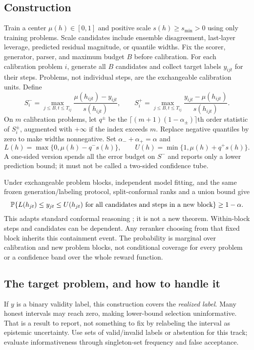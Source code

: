\subsection{Construction}
Train a center $\mu(h)\in[0,1]$ and positive scale $s(h)\ge s_{\min}>0$ using
only training problems. Scale candidates include ensemble disagreement,
last-layer leverage, predicted residual magnitude, or quantile widths. Fix the
scorer, generator, parser, and maximum budget $B$ before calibration.
For each calibration problem $i$, generate all $B$ candidates and collect target
labels $y_{ijt}$ for their steps. Problems, not individual steps, are the
exchangeable calibration units. Define
\[
 S_i^-=\max_{j\le B,t\le T_{ij}}\frac{\mu(h_{ijt})-y_{ijt}}{s(h_{ijt})},
 \qquad
 S_i^+=\max_{j\le B,t\le T_{ij}}\frac{y_{ijt}-\mu(h_{ijt})}{s(h_{ijt})}.
\]
On $m$ calibration problems, let $q^\pm$ be the
$\lceil(m+1)(1-\alpha_\pm)\rceil$th order statistic of $S_i^\pm$, augmented
with $+\infty$ if the index exceeds $m$. Replace negative quantiles by zero
to make widths nonnegative. Set $\alpha_-+\alpha_+=\alpha$ and
\[
 L(h)=\max\{0,\mu(h)-q^-s(h)\},\qquad
 U(h)=\min\{1,\mu(h)+q^+s(h)\}.
\]
A one-sided version spends all the error budget on $S^-$ and reports only a
lower prediction bound; it must not be called a two-sided confidence tube.

Under exchangeable problem blocks, independent model fitting, and the same
frozen generation/labeling protocol, split-conformal ranks and a union bound give
\[
 \mathbb{P}\{L(h_{jt})\le y_{jt}\le U(h_{jt})\text{ for all candidates and steps
 in a new block}\}\ge1-\alpha.
\]
This adapts standard conformal reasoning \cite{cqr}; it is not a new theorem.
Within-block steps and candidates can be dependent. Any reranker choosing from
that fixed block inherits this containment event. The probability is marginal
over calibration and new problem blocks, not conditional coverage for every
problem or a confidence band over the whole reward function.

\subsection{The target problem, and how to handle it}
If $y$ is a binary validity label, this construction covers the \emph{realized
label}. Many honest intervals may reach zero, making lower-bound selection
uninformative. That is a result to report, not something to fix by relabeling the
interval as epistemic uncertainty. Use sets of valid/invalid labels or abstention
for this track; evaluate informativeness through singleton-set frequency and
false acceptance.

